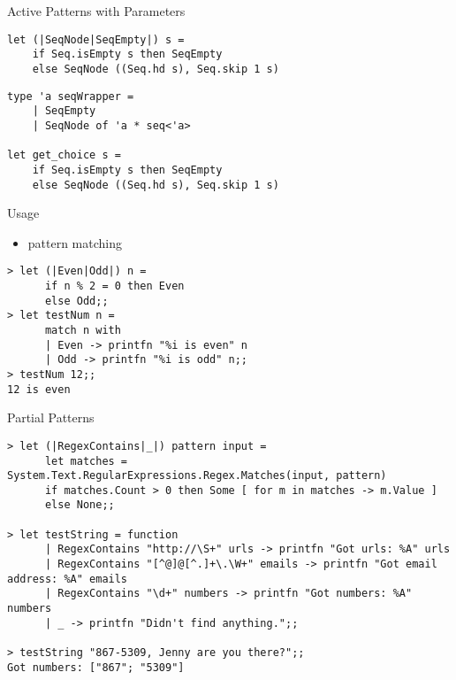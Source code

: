 \documentclass{beamer}
\begin{document}
\begin{frame}[fragile]{Active Patterns with Parameters}
  \begin{verbatim}
let (|SeqNode|SeqEmpty|) s =
    if Seq.isEmpty s then SeqEmpty
    else SeqNode ((Seq.hd s), Seq.skip 1 s)
  \end{verbatim}
  \pause
  \begin{verbatim}
type 'a seqWrapper =
    | SeqEmpty
    | SeqNode of 'a * seq<'a>

let get_choice s =
    if Seq.isEmpty s then SeqEmpty
    else SeqNode ((Seq.hd s), Seq.skip 1 s)
  \end{verbatim}
\end{frame}

\begin{frame}[fragile]{Usage}
  \begin{itemize}
    \item pattern matching
  \end{itemize}
  \begin{verbatim}
> let (|Even|Odd|) n =
      if n % 2 = 0 then Even
      else Odd;;
> let testNum n =
      match n with
      | Even -> printfn "%i is even" n
      | Odd -> printfn "%i is odd" n;;
> testNum 12;;
12 is even
  \end{verbatim}
\end{frame}

\begin{frame}[fragile]{Partial Patterns}
  \tiny
  \begin{verbatim}
> let (|RegexContains|_|) pattern input =
      let matches = System.Text.RegularExpressions.Regex.Matches(input, pattern)
      if matches.Count > 0 then Some [ for m in matches -> m.Value ]
      else None;;

> let testString = function
      | RegexContains "http://\S+" urls -> printfn "Got urls: %A" urls
      | RegexContains "[^@]@[^.]+\.\W+" emails -> printfn "Got email address: %A" emails
      | RegexContains "\d+" numbers -> printfn "Got numbers: %A" numbers
      | _ -> printfn "Didn't find anything.";;

> testString "867-5309, Jenny are you there?";;
Got numbers: ["867"; "5309"]
  \end{verbatim}
\end{frame}
\end{document}
